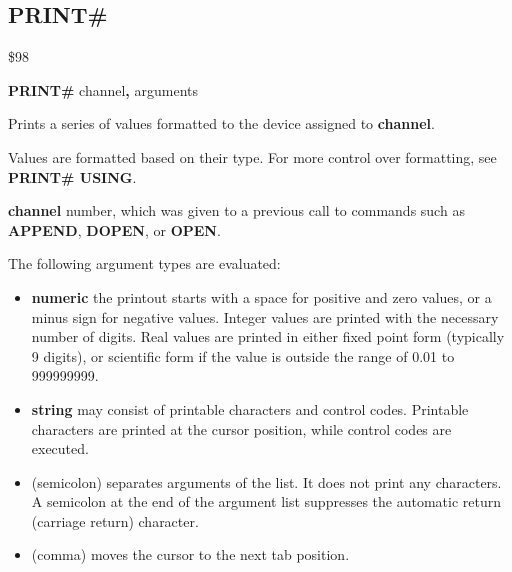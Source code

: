 
\newpage
\subsection{PRINT\#}
\begin{description}[leftmargin=2cm,style=nextline]
\item [Token:] \$98
\item [Format:] {\bf PRINT\#} channel{\bf,} arguments
\item [Usage:]  Prints a series of values formatted to the device assigned to {\bf channel}.

                Values are formatted based on their type. For more control over formatting,
                see {\bf PRINT\# USING}.

                {\bf channel} number, which was given to a previous
                call to commands such as {\bf APPEND}, {\bf DOPEN}, or {\bf OPEN}.

                The following argument types are evaluated:
                \begin{itemize}
                    \item {\bf numeric} the printout starts with a space
                    for positive and zero values, or a minus sign for
                    negative values. Integer values are printed with
                    the necessary number of digits. Real values are
                    printed in either fixed point form (typically
                    9 digits), or scientific form if the value is
                    outside the range of 0.01 to 999999999.

                    \item {\bf string} may consist of printable
                    characters and control codes. Printable characters
                    are printed at the cursor position, while control
                    codes are executed.

                    \item \screentext{;} (semicolon) separates
                    arguments of the list. It does not print any characters.
                    A semicolon at the end of the argument list suppresses
                    the automatic return (carriage return) character.

                    \item \screentext{,} (comma) moves the cursor to the next
                    tab position.
                \end{itemize}


\end{description}
